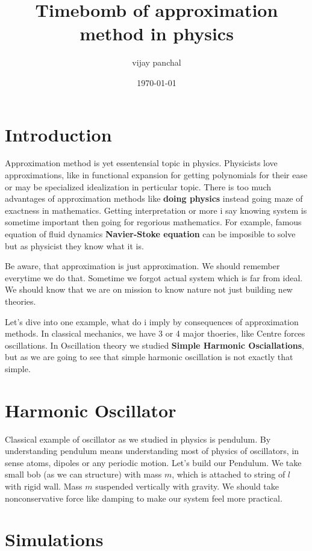 \documentclass[11pt]{article}
\author{vijay panchal}
\date{\today}
\title{Timebomb of approximation method in physics}
\begin{document}
\maketitle
\tableofcontents





\section{Introduction}
\label{sec:orgba583e7}

Approximation method is yet essentensial topic in physics. Physicists love approximations, like in functional expansion for getting polynomials for their ease or may be specialized idealization in perticular topic. There is too much advantages of approximation methods like \textbf{doing physics} instead going maze of exactness in mathematics. Getting interpretation or more i say knowing system is sometime important then going for regorious mathematics. For example, famous equation of fluid dynamics \textbf{Navier-Stoke equation} can be imposible to solve but as physicist they know what it is.

Be aware, that approximation is just approximation. We should remember everytime we do that. Sometime we forgot actual system which is far from ideal. We should know that we are on mission to know nature not just building new theories.

Let's dive into one example, what do i imply by consequences of approximation methods. In classical mechanics, we have 3 or 4 major thoeries, like Centre forces oscillations. In Oscillation theory we studied \textbf{Simple Harmonic Osciallations}, but as we are going to see that simple harmonic oscillation is not exactly that simple.

\section{Harmonic Oscillator}
\label{sec:org7fa510a}

Classical example of oscillator as we studied in physics is pendulum. By understanding pendulum means understanding most of physics of oscillators, in sense atoms, dipoles or any periodic motion. Let's build our Pendulum. We take small bob (as we can structure) with mass \(m\), which is attached to string of \(l\) with rigid wall. Mass \(m\) suspended vertically with gravity. We should take nonconservative force like damping to make our system feel more practical.
\section{Simulations}
\label{sec:org69d2dc6}
\end{document}
